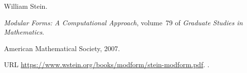 William Stein.

\newblock \emph{Modular Forms: A Computational Approach}, volume~79 of
  \emph{Graduate Studies in Mathematics}.

\newblock American Mathematical Society, 2007.

\newblock URL \url{https://www.wstein.org/books/modform/stein-modform.pdf}.
\newblock {}.